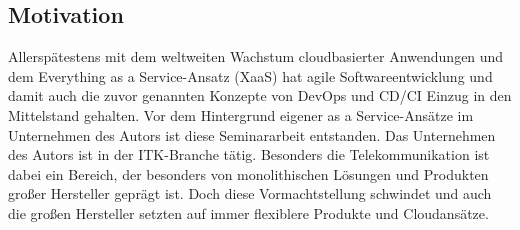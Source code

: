 \subsection{Motivation}
\label{Motivation}
Allerspätestens mit dem weltweiten Wachstum cloudbasierter Anwendungen und dem \glqq{}Everything as a Service\grqq{}-Ansatz (\acrshort{XaaS}) hat agile Softwareentwicklung und damit auch die zuvor genannten Konzepte von \gls{DevOps} und \acrshort{CD}/\acrshort{CI} Einzug in den Mittelstand gehalten. Vor dem Hintergrund eigener \glqq{}as a Service\grqq{}-Ansätze im Unternehmen des Autors ist diese Seminararbeit entstanden. Das Unternehmen des Autors ist in der \acrshort{ITK}-Branche tätig. Besonders die Telekommunikation ist dabei ein Bereich, der besonders von monolithischen Lösungen und Produkten großer Hersteller geprägt ist.  Doch diese Vormachtstellung schwindet und auch die großen Hersteller setzten auf immer flexiblere Produkte und Cloudansätze.